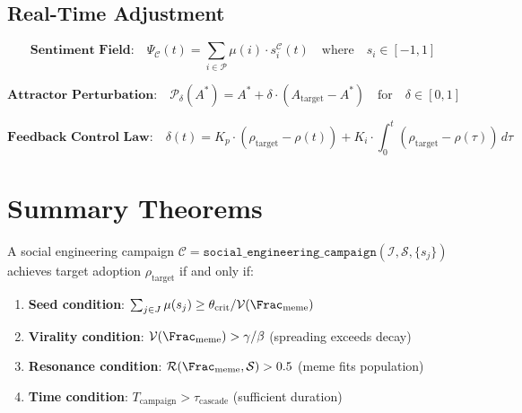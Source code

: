 \subsection{Real-Time Adjustment}

\begin{equation}
\boxed{
    \textbf{Sentiment Field:} \quad
    \Psi_{\mathcal{C}}(t) = \sum_{i \in \mathcal{P}} \mu(i) \cdot s_i^{\mathcal{C}}(t)
    \quad \text{where} \quad s_i \in [-1, 1]
}
\label{eq:sentiment}
\end{equation}

\begin{equation}
\boxed{
    \textbf{Attractor Perturbation:} \quad
    \mathcal{P}_{\delta}(A^*) = A^* + \delta \cdot (A_{\mathrm{target}} - A^*)
    \quad \text{for} \quad \delta \in [0, 1]
}
\label{eq:attractor-perturbation}
\end{equation}

\begin{equation}
\boxed{
    \textbf{Feedback Control Law:} \quad
    \delta(t) = K_p \cdot (\rho_{\mathrm{target}} - \rho(t))
    + K_i \cdot \int_0^t (\rho_{\mathrm{target}} - \rho(\tau)) \, d\tau
}
\label{eq:feedback-control}
\end{equation}

\section{Summary Theorems}

\begin{theorem}
\label{thm:se-effectiveness}
A social engineering campaign $\mathcal{C} = \mathtt{social\_engineering\_campaign}(\mathcal{I}, \mathcal{S}, \{s_j\})$ achieves target adoption $\rho_{\mathrm{target}}$ if and only if:
\begin{enumerate}
    \item \textbf{Seed condition}: $\sum_{j \in J} \mu(s_j) \geq \theta_{\mathrm{crit}} / \mathcal{V}(\Frac_{\mathrm{meme}})$
    \item \textbf{Virality condition}: $\mathcal{V}(\Frac_{\mathrm{meme}}) > \gamma / \beta$ (spreading exceeds decay)
    \item \textbf{Resonance condition}: $\mathcal{R}(\Frac_{\mathrm{meme}}, \mathcal{S}) > 0.5$ (meme fits population)
    \item \textbf{Time condition}: $T_{\mathrm{campaign}} > \tau_{\mathrm{cascade}}$ (sufficient duration)
\end{enumerate}
\end{theorem}

